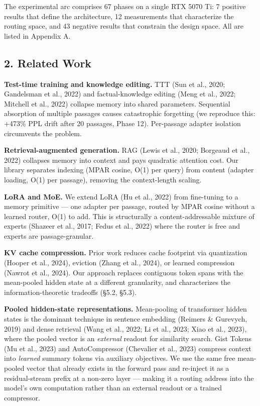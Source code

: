The experimental arc comprises 67 phases on a single RTX 5070 Ti: 7 positive results that define the architecture, 12 measurements that characterize the routing space, and 43 negative results that constrain the design space. All are listed in Appendix A.

\subsection{2. Related Work}\label{related-work}

\textbf{Test-time training and knowledge editing.} TTT (Sun et al., 2020; Gandelsman et al., 2022) and factual-knowledge editing (Meng et al., 2022; Mitchell et al., 2022) collapse memory into shared parameters. Sequential absorption of multiple passages causes catastrophic forgetting (we reproduce this: +473\% PPL drift after 20 passages, Phase 12). Per-passage adapter isolation circumvents the problem.

\textbf{Retrieval-augmented generation.} RAG (Lewis et al., 2020; Borgeaud et al., 2022) collapses memory into context and pays quadratic attention cost. Our library separates indexing (MPAR cosine, O(1) per query) from content (adapter loading, O(1) per passage), removing the context-length scaling.

\textbf{LoRA and MoE.} We extend LoRA (Hu et al., 2022) from fine-tuning to a memory primitive --- one adapter per passage, routed by MPAR cosine without a learned router, O(1) to add. This is structurally a content-addressable mixture of experts (Shazeer et al., 2017; Fedus et al., 2022) where the router is free and experts are passage-granular.

\textbf{KV cache compression.} Prior work reduces cache footprint via quantization (Hooper et al., 2024), eviction (Zhang et al., 2024), or learned compression (Nawrot et al., 2024). Our approach replaces contiguous token spans with the mean-pooled hidden state at a different granularity, and characterizes the information-theoretic tradeoffs (§5.2, §5.3).

\textbf{Pooled hidden-state representations.} Mean-pooling of transformer hidden states is the dominant technique in sentence embedding (Reimers \& Gurevych, 2019) and dense retrieval (Wang et al., 2022; Li et al., 2023; Xiao et al., 2023), where the pooled vector is an \emph{external} readout for similarity search. Gist Tokens (Mu et al., 2023) and AutoCompressor (Chevalier et al., 2023) compress context into \emph{learned} summary tokens via auxiliary objectives. We use the same free mean-pooled vector that already exists in the forward pass and re-inject it as a residual-stream prefix at a non-zero layer --- making it a routing address into the model's own computation rather than an external readout or a trained compressor.

